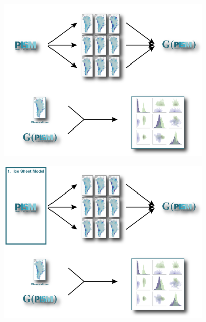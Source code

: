 \documentclass[hide notes,intlimits]{beamer}
\begin{document}
\begin{frame}{}
  \vspace{-1.5em}
    \begin{minipage}[t][8.2cm][t]{\textwidth}
    \begin{figure}
      \includegraphics[height=8cm]{surrogate_model_clean}
    \end{figure}
    \end{minipage}
\end{frame}

\begin{frame}{}
  \vspace{-1.5em}
    \begin{minipage}[t][8.2cm][t]{\textwidth}
    \begin{figure}
      \includegraphics[height=8cm]{surrogate_model_1}
    \end{figure}
    \end{minipage}
\end{frame}
\end{document}
